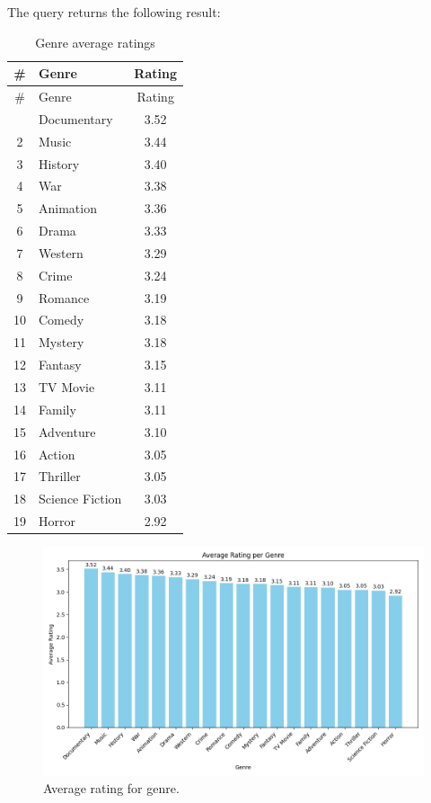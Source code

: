 \documentclass{Configuration_Files/PoliMi3i_thesis}
\begin{document}
The query returns the following result:

\begin{longtable}[!h]{|c|l|c|}
\caption{Genre average ratings} \\
\hline
\# & Genre & Rating \\
\hline
\endfirsthead
\hline
\# & Genre & Rating \\
\hline
\endhead
\hline
\endfoot
\hline
\endlastfoot
1 & Documentary       & 3.52 \\
2 & Music             & 3.44 \\
3 & History           & 3.40 \\
4 & War               & 3.38 \\
5 & Animation         & 3.36 \\
6 & Drama             & 3.33 \\
7 & Western           & 3.29 \\
8 & Crime             & 3.24 \\
9 & Romance           & 3.19 \\
10 & Comedy            & 3.18 \\
11 & Mystery           & 3.18 \\
12 & Fantasy           & 3.15 \\
13 & TV Movie          & 3.11 \\
14 & Family            & 3.11 \\
15 & Adventure         & 3.10 \\
16 & Action            & 3.05 \\
17 & Thriller          & 3.05 \\
18 & Science Fiction   & 3.03 \\
19 & Horror            & 2.92 \\
\end{longtable}

\begin{figure}[!h]
  \centering
  \includegraphics[width=\textwidth]{Project Template/letterboxd/visualization/average_rating_genre.png}
  \caption{Average rating for genre.}
  \label{fig:average_rating_genre}
\end{figure}
\end{document}
